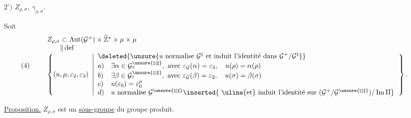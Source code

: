 

$2^\circ)$ \quad $Z_{\rho,\sigma},\ \gamma_{\rho,\sigma}$.

Soit
\[
(4)\qquad
\begin{array}{l}
 Z_{\rho,\sigma}\subset
 \operatorname{Aut}(\mathcal{G}^{+})\times
 \widehat{\mathbb{Z}}^{*}\times\mu\times\mu\\
 \phantom{Z_{\rho,\sigma}}\Vert\,\mathrm{def}\\
 \left\{(u,\mu,\varepsilon_2,\varepsilon_3)\ \left|
 \begin{array}{ll}
 \multicolumn{2}{l}{\deleted{\unsure{u\ \text{normalise}\ \mathcal{G}^{\natural}\ 
 \text{et induit l'identité dans}\ \mathcal{G}^{+}/\mathcal{G}^{\natural}}}}\\
 a)&\exists\alpha\in\mathcal{G}_{\tau}^{\unsure{\natural|\sharp}},
 \ \text{avec }\varepsilon_{\mathcal{G}}(\alpha)=\varepsilon_3,
 \quad u(\rho)=\alpha(\rho)\\
 b)&\exists\beta\in\mathcal{G}_{\tau}^{\unsure{\natural|\sharp}},
 \ \text{avec }\varepsilon_{\mathcal{G}}(\beta)=\varepsilon_2,
 \quad u(\sigma)=\beta(\sigma)\\
 c)&u(\varepsilon_0)=\varepsilon_0^\mu\\
 d)&u\ \text{normalise }\mathcal{G}^{\unsure{\natural|\sharp}}
 \inserted{\ \text{\uline{et} induit l'identité sur }
 (\mathcal{G}^{+}/\mathcal{G}^{\unsure{\natural|\sharp}})/\operatorname{Im}\Pi}
 \end{array}\right.\right\}.
\end{array}
\]

\uline{Proposition.} \quad $Z_{\rho,\sigma}$ est un \uline{sous-groupe}
du groupe produit.

